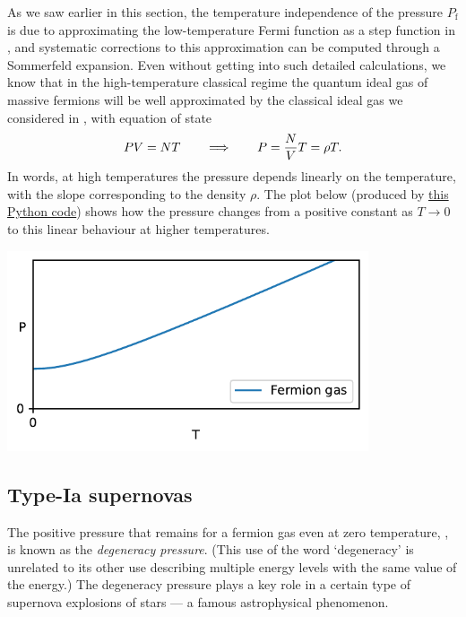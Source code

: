 As we saw earlier in this section, the temperature independence of the pressure $P_{\text{f}}$ is due to approximating the low-temperature Fermi function as a step function in , and systematic corrections to this approximation can be computed through a Sommerfeld expansion.
Even without getting into such detailed calculations, we know that in the high-temperature classical regime the quantum ideal gas of massive fermions will be well approximated by the classical ideal gas we considered in , with equation of state
\begin{equation}
  PV = NT \qquad \Longrightarrow \qquad P = \frac{N}{V} T = \rho T.
\end{equation}
In words, at high temperatures the pressure depends linearly on the temperature, with the slope corresponding to the density $\rho$.
The plot below (produced by \href{https://github.com/daschaich/MATH327_2025/blob/main/lecture_notes/unit08_pressure.py}{this Python code}) shows how the pressure changes from a positive constant as $T \to 0$ to this linear behaviour at higher temperatures. \\[-24 pt]
\begin{center}\includegraphics[width=0.8\textwidth]{figs/unit08_pressure.pdf}\end{center}



\subsection{Type-{\textrm I}a supernovas}
The positive pressure that remains for a fermion gas even at zero temperature, , is known as the \textit{degeneracy pressure}.
(This use of the word `degeneracy' is unrelated to its other use describing multiple energy levels with the same value of the energy.)
The degeneracy pressure plays a key role in a certain type of supernova explosions of stars --- a famous astrophysical phenomenon.

